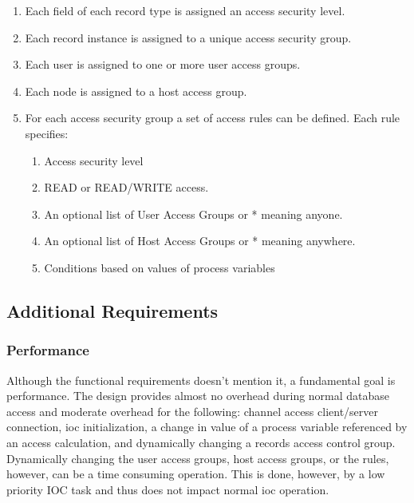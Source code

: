 \begin{enumerate}
\item Each field of each record type is assigned an access security level.

\item Each record instance is assigned to a unique access security group.

\item Each user is assigned to one or more user access groups.

\item Each node is assigned to a host access group.

\item For each access security group a set of access rules can be defined. Each rule specifies: 

\begin{enumerate}

\item Access security level

\item READ or READ/WRITE access.

\item An optional list of User Access Groups or * meaning anyone.

\item An optional list of Host Access Groups or * meaning anywhere.

\item Conditions based on values of process variables

\end{enumerate}

\end{enumerate}

\subsection{Additional Requirements}

\subsubsection{Performance}

Although the functional requirements doesn't mention it, a fundamental goal is performance. The design provides almost 
no overhead during normal database access and moderate overhead for the following: channel access client/server 
connection, ioc initialization, a change in value of a process variable referenced by an access calculation, and dynamically 
changing a records access control group. Dynamically changing the user access groups, host access groups, or the rules, 
however, can be a time consuming operation. This is done, however, by a low priority IOC task and thus does not impact 
normal ioc operation. 


